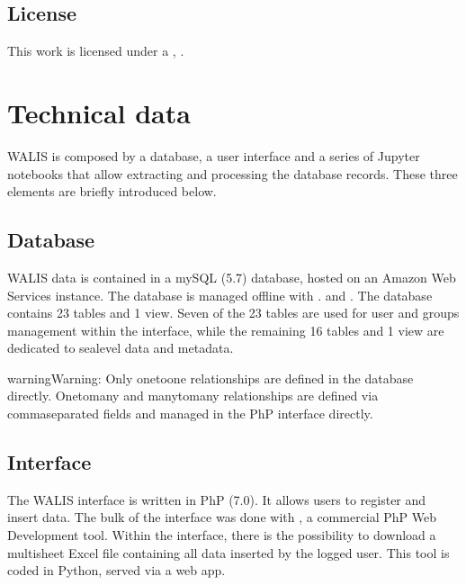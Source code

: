 \documentclass[letterpaper,10pt,english]{sphinxmanual}
\let\sphinxpxdimen\pdfpxdimen\else\newdimen\sphinxpxdimen
\begin{document}
\section{License}
\label{\detokenize{first:license}}
This work is licensed under a , .
\begin{quote}

\noindent{\hspace*{\fill}\sphinxincludegraphics[width=100\sphinxpxdimen]{{88x31}.png}\hspace*{\fill}}
\end{quote}


\chapter{Technical data}
\label{\detokenize{tech_data:technical-data}}\label{\detokenize{tech_data::doc}}
WALIS is composed by a database, a user interface and a series of Jupyter notebooks that allow extracting and processing the database records. These three elements are briefly introduced below.


\section{Database}
\label{\detokenize{tech_data:database}}
WALIS data is contained in a mySQL (5.7) database, hosted on an Amazon Web Services instance. The database is managed offline with . and . The database contains 23 tables and 1 view. Seven of the 23 tables are used for user and groups management within the interface, while the remaining 16 tables and 1 view are dedicated to sea\sphinxhyphen{}level data and meta\sphinxhyphen{}data.

\begin{sphinxadmonition}{warning}{Warning:}
Only one\sphinxhyphen{}to\sphinxhyphen{}one relationships are defined in the database directly. One\sphinxhyphen{}to\sphinxhyphen{}many and many\sphinxhyphen{}to\sphinxhyphen{}many relationships are defined via comma\sphinxhyphen{}separated fields and managed in the PhP interface directly.
\end{sphinxadmonition}


\section{Interface}
\label{\detokenize{tech_data:interface}}
The WALIS interface is written in PhP (7.0). It allows users to register and insert data. The bulk of the interface was done with , a commercial PhP Web Development tool. Within the interface, there is the possibility to download a multi\sphinxhyphen{}sheet Excel file containing all data inserted by the logged user. This tool is coded in Python, served via a  web app.
\end{document}
